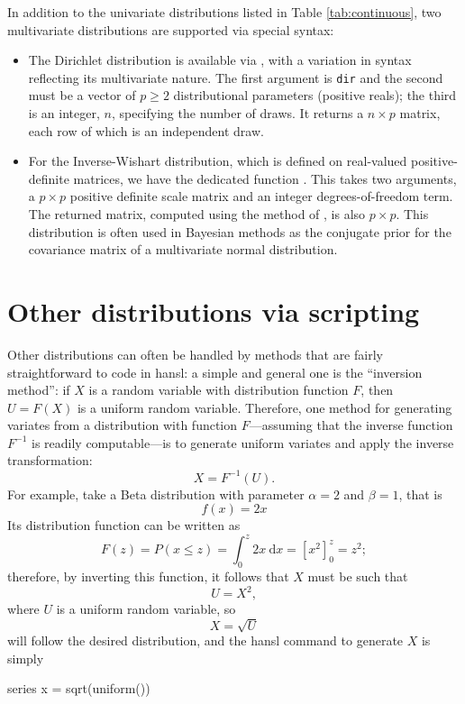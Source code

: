 In addition to the univariate distributions listed in Table
\ref{tab:continuous}, two multivariate distributions are supported via
special syntax: 
\begin{itemize}
\item The Dirichlet distribution is available via , with
  a variation in syntax reflecting its multivariate nature. The first
  argument is \texttt{dir} and the second must be a vector of
  $p \ge 2$ distributional parameters (positive reals); the third is
  an integer, $n$, specifying the number of draws. It returns a
  $n \times p$ matrix, each row of which is an independent draw.
\item For the Inverse-Wishart distribution, which is defined on
  real-valued positive-definite matrices, we have the dedicated
  function . This takes two arguments, a $p\times p$
  positive definite scale matrix and an integer degrees-of-freedom
  term. The returned matrix, computed using the method of
  \cite{odell-feiveson66}, is also $p\times p$. This distribution is
  often used in Bayesian methods as the conjugate prior for the
  covariance matrix of a multivariate normal distribution.
\end{itemize}

\section{Other distributions via scripting}
\label{sec:randgen-other-hansl}

Other distributions can often be handled by methods that are fairly
straightforward to code in hansl: a simple and general one is the
``inversion method'': if $X$ is a random variable with distribution
function $F$, then $U = F(X)$ is a uniform random variable. Therefore,
one method for generating variates from a distribution with function
$F$---assuming that the inverse function $F^{-1}$ is readily
computable---is to generate uniform variates and apply the inverse
transformation:
\[
  X = F^{-1}(U) .
\]
For example, take a Beta distribution with parameter $\alpha = 2$ and
$\beta=1$, that is
\[
  f(x) = 2 x
\]
Its distribution function can be written as
\[
  F(z) = P(x \le z) = \int_{0}^z 2 x\ \mathrm{d}x = \left[ x^2\right]_0^z = z^2;
\]
therefore, by inverting this function, it follows that $X$ must be
such that
\[
  U = X^2,
\]
where $U$ is a uniform random variable, so
\[
  X = \sqrt{U}
\]
will follow the desired distribution, and the hansl command to
generate $X$ is simply
\begin{code}
  series x = sqrt(uniform())
\end{code}

